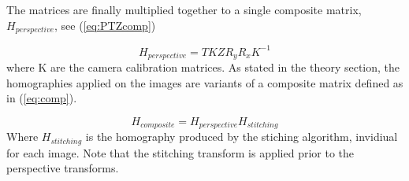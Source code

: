 	The matrices are finally multiplied together to a single composite matrix, $H_{perspective}$, see (\ref{eq:PTZcomp})

	\begin{equation}
		H_{perspective}=TKZR_yR_xK^{-1}
		\label{eq:PTZcomp}
	\end{equation}
	where K are the camera calibration matrices.
	As stated in the theory section, the homographies applied on the images are variants of a composite matrix defined as in (\ref{eq:comp}).

	\begin{equation}
		H_{composite}=H_{perspective}H_{stitching}
		\label{eq:comp}
	\end{equation}
	Where $H_{stitching}$ is the homography produced by the stiching algorithm, invidiual for each image. Note that the stitching transform is applied prior to the perspective transforms.
